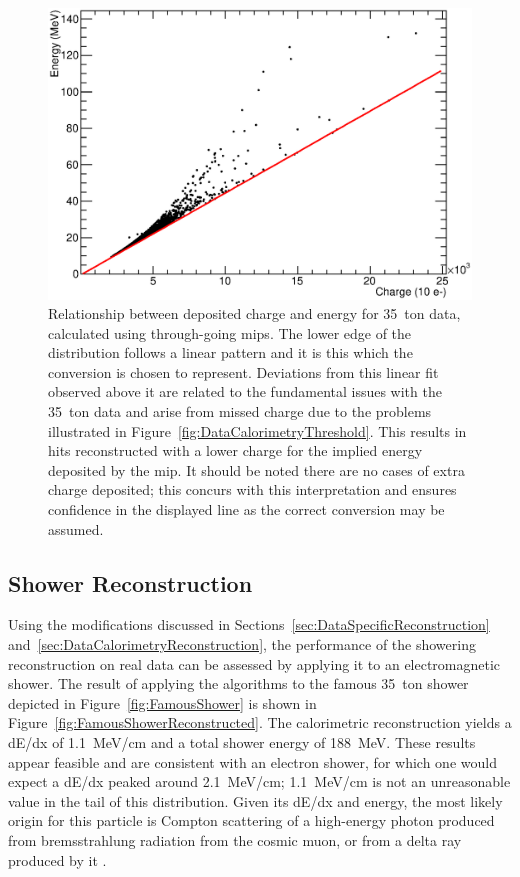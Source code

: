 \begin{figure}
  \centering
  \includegraphics[width=12cm]{ChargeEnergy.eps}
  \caption[Relationship between deposited charge and energy for 35~ton data, calculated using through-going mips.]{Relationship between deposited charge and energy for 35~ton data, calculated using through-going mips.  The lower edge of the distribution follows a linear pattern and it is this which the conversion is chosen to represent.  Deviations from this linear fit observed above it are related to the fundamental issues with the 35~ton data and arise from missed charge due to the problems illustrated in Figure~\ref{fig:DataCalorimetryThreshold}.  This results in hits reconstructed with a lower charge for the implied energy deposited by the mip.  It should be noted there are no cases of extra charge deposited; this concurs with this interpretation and ensures confidence in the displayed line as the correct conversion may be assumed.}
  \label{fig:DataShowerEnergyConversion}
\end{figure}

\subsection{Shower Reconstruction}\label{sec:DataShowerReconstruction}

Using the modifications discussed in Sections~\ref{sec:DataSpecificReconstruction} and~\ref{sec:DataCalorimetryReconstruction}, the performance of the showering reconstruction on real data can be assessed by applying it to an electromagnetic shower.  The result of applying the algorithms to the famous 35~ton shower depicted in Figure~\ref{fig:FamousShower} is shown in Figure~\ref{fig:FamousShowerReconstructed}.  The calorimetric reconstruction yields a dE/dx of 1.1~MeV/cm and a total shower energy of 188~MeV.  These results appear feasible and are consistent with an electron shower, for which one would expect a dE/dx peaked around 2.1~MeV/cm; 1.1~MeV/cm is not an unreasonable value in the tail of this distribution.  Given its dE/dx and energy, the most likely origin for this particle is Compton scattering of a high-energy photon produced from bremsstrahlung radiation from the cosmic muon, or from a delta ray produced by it \cite{MicroBooNECosmics2016}.

